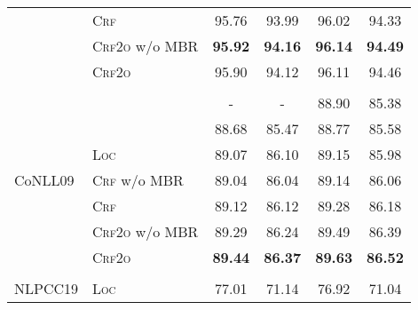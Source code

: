 \begin{table}[tb!]
\begin{tabular}{llcccc}
                             & \textsc{Crf}                      & 95.76                   & 93.99                    & 96.02                            & 94.33                            \\
                             & \textsc{Crf2o} w/o MBR            & \textbf{95.92}          & \textbf{94.16}           & \textbf{96.14}                   & \textbf{94.49}                   \\
                             & \textsc{Crf2o}                    & 95.90                   & 94.12                    & 96.11                            & 94.46                            \\[2pt]
    \hline
    \\[-15pt]
    \multirow{7}{*}{CoNLL09} & \citet{dozat-etal-2017-biaffine}  & -                       & -                        & 88.90                            & 85.38                            \\
                             & \citet{li-etal-2019-attentive}    & 88.68                   & 85.47                    & 88.77                            & 85.58                            \\[3pt]
                             & \textsc{Loc}                      & 89.07                   & 86.10                    & 89.15                            & 85.98                            \\
                             & \textsc{Crf} w/o MBR              & 89.04                   & 86.04                    & 89.14                            & 86.06                            \\
                             & \textsc{Crf}                      & 89.12                   & 86.12                    & 89.28                            & 86.18\rlap{$^\dagger$}           \\
                             & \textsc{Crf2o} w/o MBR            & 89.29                   & 86.24                    & 89.49                            & 86.39                            \\
                             & \textsc{Crf2o}                    & \textbf{89.44}          & \textbf{86.37}           & \textbf{89.63}\rlap{$^\ddagger$} & \textbf{86.52}\rlap{$^\ddagger$} \\[2pt]
    \hline
    \\[-15pt]
    \multirow{5}{*}{NLPCC19} & \textsc{Loc}                      & 77.01                   & 71.14                    & 76.92                            & 71.04                            \\

\end{tabular}
\end{table}
